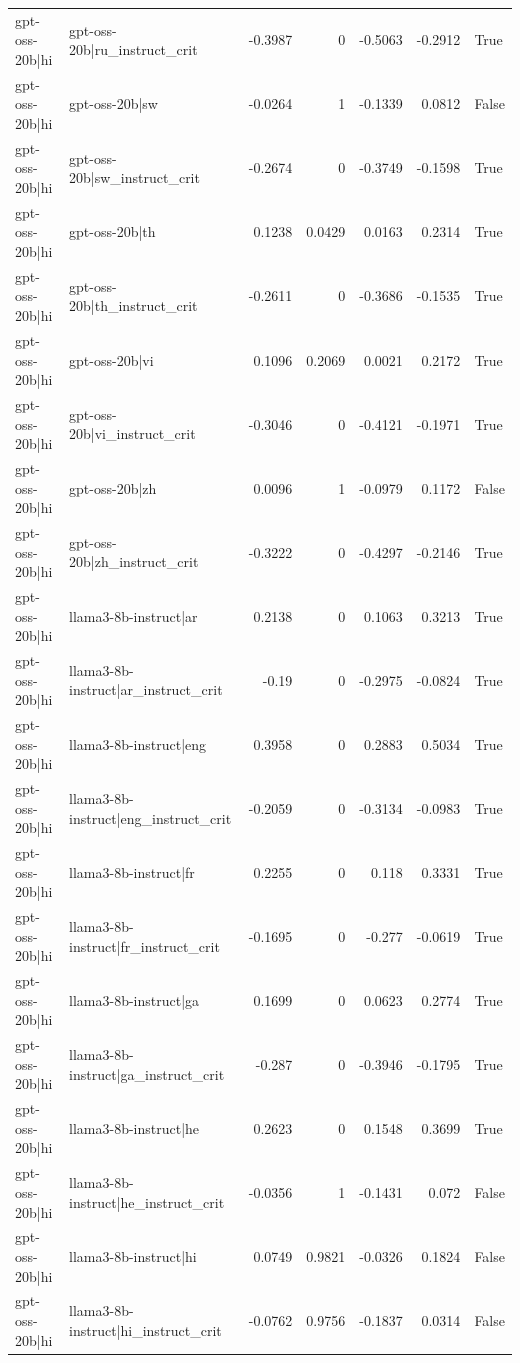 \begin{table}
\begin{tabular}{l l r r r r l}
gpt-oss-20b|hi & gpt-oss-20b|ru_instruct_crit & -0.3987 & 0 & -0.5063 & -0.2912 & True \\
gpt-oss-20b|hi & gpt-oss-20b|sw & -0.0264 & 1 & -0.1339 & 0.0812 & False \\
gpt-oss-20b|hi & gpt-oss-20b|sw_instruct_crit & -0.2674 & 0 & -0.3749 & -0.1598 & True \\
gpt-oss-20b|hi & gpt-oss-20b|th & 0.1238 & 0.0429 & 0.0163 & 0.2314 & True \\
gpt-oss-20b|hi & gpt-oss-20b|th_instruct_crit & -0.2611 & 0 & -0.3686 & -0.1535 & True \\
gpt-oss-20b|hi & gpt-oss-20b|vi & 0.1096 & 0.2069 & 0.0021 & 0.2172 & True \\
gpt-oss-20b|hi & gpt-oss-20b|vi_instruct_crit & -0.3046 & 0 & -0.4121 & -0.1971 & True \\
gpt-oss-20b|hi & gpt-oss-20b|zh & 0.0096 & 1 & -0.0979 & 0.1172 & False \\
gpt-oss-20b|hi & gpt-oss-20b|zh_instruct_crit & -0.3222 & 0 & -0.4297 & -0.2146 & True \\
gpt-oss-20b|hi & llama3-8b-instruct|ar & 0.2138 & 0 & 0.1063 & 0.3213 & True \\
gpt-oss-20b|hi & llama3-8b-instruct|ar_instruct_crit & -0.19 & 0 & -0.2975 & -0.0824 & True \\
gpt-oss-20b|hi & llama3-8b-instruct|eng & 0.3958 & 0 & 0.2883 & 0.5034 & True \\
gpt-oss-20b|hi & llama3-8b-instruct|eng_instruct_crit & -0.2059 & 0 & -0.3134 & -0.0983 & True \\
gpt-oss-20b|hi & llama3-8b-instruct|fr & 0.2255 & 0 & 0.118 & 0.3331 & True \\
gpt-oss-20b|hi & llama3-8b-instruct|fr_instruct_crit & -0.1695 & 0 & -0.277 & -0.0619 & True \\
gpt-oss-20b|hi & llama3-8b-instruct|ga & 0.1699 & 0 & 0.0623 & 0.2774 & True \\
gpt-oss-20b|hi & llama3-8b-instruct|ga_instruct_crit & -0.287 & 0 & -0.3946 & -0.1795 & True \\
gpt-oss-20b|hi & llama3-8b-instruct|he & 0.2623 & 0 & 0.1548 & 0.3699 & True \\
gpt-oss-20b|hi & llama3-8b-instruct|he_instruct_crit & -0.0356 & 1 & -0.1431 & 0.072 & False \\
gpt-oss-20b|hi & llama3-8b-instruct|hi & 0.0749 & 0.9821 & -0.0326 & 0.1824 & False \\
gpt-oss-20b|hi & llama3-8b-instruct|hi_instruct_crit & -0.0762 & 0.9756 & -0.1837 & 0.0314 & False \\

\end{tabular}
\end{table}
